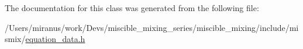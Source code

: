 The documentation for this class was generated from the following file\+:\begin{DoxyCompactItemize}
\item 
/\+Users/miranus/work/\+Devs/miscible\+\_\+mixing\+\_\+series/miscible\+\_\+mixing/include/mismix/\hyperlink{equation__data_8h}{equation\+\_\+data.\+h}\end{DoxyCompactItemize}

